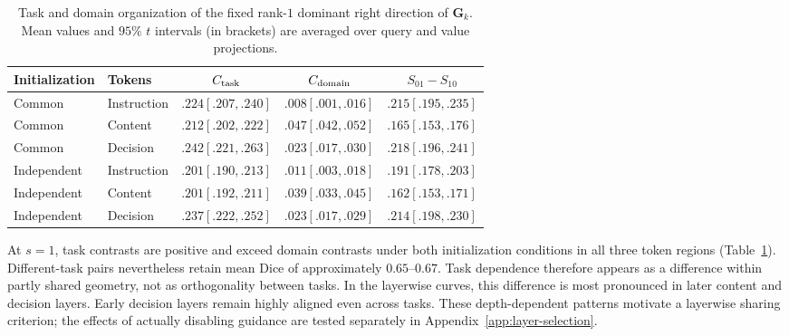 \documentclass[11pt,letterpaper]{article}
\newcommand{\bG}{\mathbf{G}}
\begin{document}
\begin{table}[!ht]
\centering
\caption{Task and domain organization of the fixed rank-$1$ dominant right direction of $\bG_k$. Mean values and $95\%$ $t$ intervals (in brackets) are averaged over query and value projections.}
\label{tab:gpt-task-structure}
\small
\begin{tabular}{llccc}
\toprule
Initialization & Tokens & $C_{\rm task}$ & $C_{\rm domain}$ & $S_{01}-S_{10}$ \\
\midrule
Common & Instruction & $.224 [ .207, .240]$ & $.008 [ .001, .016]$ & $.215 [ .195, .235]$ \\
Common & Content     & $.212 [ .202, .222]$ & $.047 [ .042, .052]$ & $.165 [ .153, .176]$ \\
Common & Decision    & $.242 [ .221, .263]$ & $.023 [ .017, .030]$ & $.218 [ .196, .241]$ \\
Independent & Instruction & $.201 [ .190, .213]$ & $.011 [ .003, .018]$ & $.191 [ .178, .203]$ \\
Independent & Content     & $.201 [ .192, .211]$ & $.039 [ .033, .045]$ & $.162 [ .153, .171]$ \\
Independent & Decision    & $.237 [ .222, .252]$ & $.023 [ .017, .029]$ & $.214 [ .198, .230]$ \\
\bottomrule
\end{tabular}
\end{table}

At $s=1$, task contrasts are positive and exceed domain contrasts under
both initialization conditions in all three token regions
(Table~\ref{tab:gpt-task-structure}).
Different-task pairs nevertheless retain mean Dice of approximately
$0.65$--$0.67$. Task dependence therefore appears as a difference within
partly shared geometry, not as orthogonality between tasks. In the
layerwise curves, this difference is most pronounced in later content
and decision layers. Early decision layers remain highly aligned even
across tasks. These depth-dependent patterns motivate a layerwise sharing
criterion; the effects of actually disabling guidance are tested separately
in Appendix~\ref{app:layer-selection}.
\end{document}
